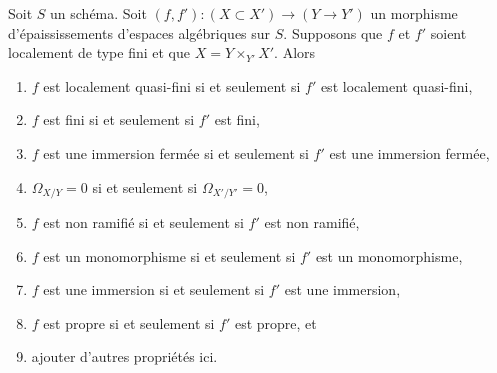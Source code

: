 \begin{lemma}
\label{lemma-properties-that-extend-over-thickenings}
Soit $S$ un schéma. Soit $(f, f') : (X \subset X') \to (Y \to Y')$ un
morphisme d'épaississements d'espaces algébriques sur $S$. Supposons que $f$ et $f'$
soient localement de type fini et que $X = Y \times_{Y'} X'$. Alors
\begin{enumerate}
\item $f$ est localement quasi-fini si et seulement si $f'$ est localement quasi-fini,
\item $f$ est fini si et seulement si $f'$ est fini,
\item $f$ est une immersion fermée si et seulement si $f'$ est une immersion fermée,
\item $\Omega_{X/Y} = 0$ si et seulement si $\Omega_{X'/Y'} = 0$,
\item $f$ est non ramifié si et seulement si $f'$ est non ramifié,
\item $f$ est un monomorphisme si et seulement si $f'$ est un monomorphisme,
\item $f$ est une immersion si et seulement si $f'$ est une immersion,
\item $f$ est propre si et seulement si $f'$ est propre, et
\item ajouter d'autres propriétés ici.
\end{enumerate}
\end{lemma}

